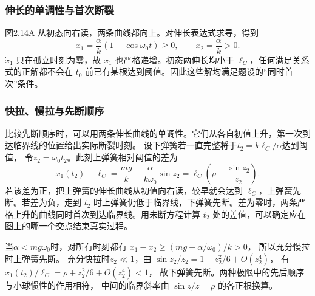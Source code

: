 \documentclass[UTF8,fontset=fandol,a4paper,11pt]{ctexart}
\begin{document}
\subsubsection*{伸长的单调性与首次断裂}
图2.14A 从初态向右读，两条曲线都向上。对伸长表达式求导，得到
\[
\dot x_1=\frac\alpha k(1-\cos\omega_0t)\geq0,
\qquad\dot x_2=\frac\alpha k>0.
\]
$\dot x_1$ 只在孤立时刻为零，故 $x_1$ 也严格递增。初态两伸长均小于 $\ell_C$，任何满足关系式的正解都不会在 $t_0$ 前已有某根达到阈值。因此这些解均满足题设的“同时首次”条件。
\subsubsection*{快拉、慢拉与先断顺序}
比较先断顺序时，可以用两条伸长曲线的单调性。它们从各自初值上升，第一次到达临界线的位置给出实际断裂时刻。
设下弹簧若一直完整将于$t_2=k\ell_C/\alpha$达到阈值，
令$z_2=\omega_0t_2$。此刻上弹簧相对阈值的差为
\[
x_1(t_2)-\ell_C
=\frac{mg}{k}-\frac{\alpha}{k\omega_0}\sin z_2
=\ell_C\left(\rho-\frac{\sin z_2}{z_2}\right).
\]
若该差为正，把上弹簧的伸长曲线从初值向右读，较早就会达到 $\ell_C$，上弹簧先断。若差为负，走到 $t_2$ 时上弹簧仍低于临界线，下弹簧先断。差为零时，两条严格上升的曲线同时首次到达临界线。用未断方程计算 $t_2$ 处的差值，可以确定应在图上的哪一个交点结束真实过程。

当$\alpha<mg\omega_0$时，对所有时刻都有
$x_1-x_2\geq(mg-\alpha/\omega_0)/k>0$，
所以充分慢拉时上弹簧先断。
充分快拉时$z_2\ll1$，由
$\sin z_2/z_2=1-z_2^2/6+O(z_2^4)$，
有$x_1(t_2)/\ell_C=\rho+z_2^2/6+O(z_2^4)<1$，
故下弹簧先断。两种极限中的先后顺序与小球惯性的作用相符，
中间的临界斜率由 $\sin z/z=\rho$ 的各正根换算。
\end{document}
